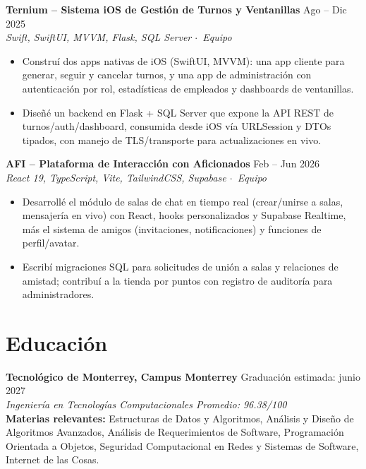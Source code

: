 \documentclass[10pt,letterpaper]{article}
\newcommand{\project}[3]{\vspace{2pt}\textbf{#1} \hfill #2 \\ \textit{#3} \par\vspace{1pt}}
\newcommand{\resumeSubheading}[3]{%
  \vspace{2pt}\textbf{#1} \hfill #2 \\
  \textit{#3} \\
}
\begin{document}
\project{Ternium -- Sistema iOS de Gesti\'on de Turnos y Ventanillas}{Ago -- Dic 2025}{Swift, SwiftUI, MVVM, Flask, SQL Server \quad $\cdot$\ Equipo}
\begin{itemize}
    \item Constru\'i dos apps nativas de iOS (SwiftUI, MVVM): una app cliente para generar, seguir y cancelar turnos, y una app de administraci\'on con autenticaci\'on por rol, estad\'isticas de empleados y dashboards de ventanillas.
    \item Dise\~n\'e un backend en Flask + SQL Server que expone la API REST de turnos/auth/dashboard, consumida desde iOS v\'ia URLSession y DTOs tipados, con manejo de TLS/transporte para actualizaciones en vivo.
\end{itemize}

\project{AFI -- Plataforma de Interacci\'on con Aficionados}{Feb -- Jun 2026}{React 19, TypeScript, Vite, TailwindCSS, Supabase \quad $\cdot$\ Equipo}
\begin{itemize}
    \item Desarroll\'e el m\'odulo de salas de chat en tiempo real (crear/unirse a salas, mensajer\'ia en vivo) con React, hooks personalizados y Supabase Realtime, m\'as el sistema de amigos (invitaciones, notificaciones) y funciones de perfil/avatar.
    \item Escrib\'i migraciones SQL para solicitudes de uni\'on a salas y relaciones de amistad; contribu\'i a la tienda por puntos con registro de auditor\'ia para administradores.
\end{itemize}


\section{Educaci\'on}
\resumeSubheading{Tecnol\'ogico de Monterrey, Campus Monterrey}{Graduaci\'on estimada: junio 2027}{Ingenier\'ia en Tecnolog\'ias Computacionales \quad Promedio: 96.38/100}
\textbf{Materias relevantes:} Estructuras de Datos y Algoritmos, An\'alisis y Dise\~no de Algoritmos Avanzados, An\'alisis de Requerimientos de Software, Programaci\'on Orientada a Objetos, Seguridad Computacional en Redes y Sistemas de Software, Internet de las Cosas.
\end{document}
